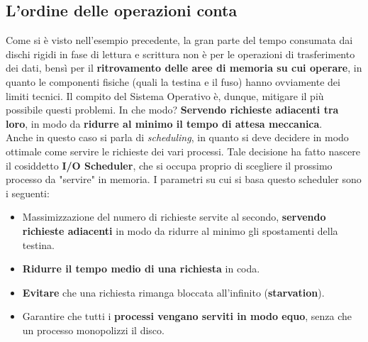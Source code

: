 \documentclass[12pt]{report}
\begin{document}
	\subsection{L'ordine delle operazioni conta}
	Come si è visto nell'esempio precedente, la gran parte del tempo consumata dai dischi rigidi in fase di lettura e scrittura non è per le operazioni di trasferimento dei dati, bensì per il \textbf{ritrovamento delle aree di memoria su cui operare}, in quanto le componenti fisiche (quali la testina e il fuso) hanno ovviamente dei limiti tecnici. Il compito del Sistema Operativo è, dunque, mitigare il più possibile questi problemi. In che modo? \textbf{Servendo richieste adiacenti tra loro}, in modo da \textbf{ridurre al minimo il tempo di attesa meccanica}.\\
	Anche in questo caso si parla di \textit{scheduling}, in quanto si deve decidere in modo ottimale come servire le richieste dei vari processi. Tale decisione ha fatto nascere il cosiddetto \textbf{I/O Scheduler}, che si occupa proprio di scegliere il prossimo processo da "servire" in memoria. I parametri su cui si basa questo scheduler sono i seguenti:
	\begin{itemize}
		\item Massimizzazione del numero di richieste servite al secondo, \textbf{servendo richieste adiacenti} in modo da ridurre al minimo gli spostamenti della testina.
		
		\item \textbf{Ridurre il tempo medio di una richiesta} in coda.
		
		\item \textbf{Evitare} che una richiesta rimanga bloccata all'infinito (\textbf{starvation}).
		
		\item Garantire che tutti i \textbf{processi vengano serviti in modo equo}, senza che un processo monopolizzi il disco.
	\end{itemize}
	
\end{document}
